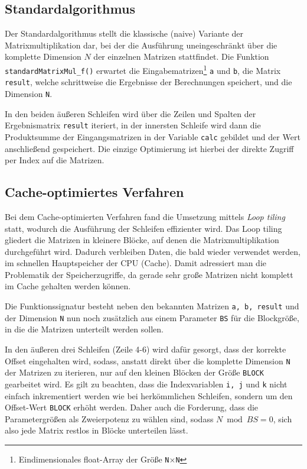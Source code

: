 \documentclass[a4paper,11pt]{scrartcl}
\begin{document}
\subsection{Standardalgorithmus}
Der Standardalgorithmus stellt die klassische (naive) Variante der Matrixmultiplikation
dar, bei der die Ausführung uneingeschränkt über die komplette Dimension $N$ der einzelnen Matrizen 
stattfindet. Die Funktion \texttt{standardMatrixMul\_f()} erwartet die Eingabematrizen\footnote{
Eindimensionales float-Array der Größe \texttt{N$\times$N}} \texttt{a} und \texttt{b},
die Matrix \texttt{result}, welche schrittweise die Ergebnisse der Berechnungen speichert, 
und die Dimension \texttt{N}.\newline




In den beiden äußeren Schleifen 
wird über die Zeilen und Spalten der Ergebnismatrix \texttt{result} iteriert,
in der innersten Schleife wird dann die Produktsumme der Eingangsmatrizen in der
Variable \texttt{calc} gebildet und der Wert anschließend gespeichert.
Die einzige Optimierung ist hierbei der direkte Zugriff per Index auf die Matrizen.


\subsection{Cache-optimiertes Verfahren}
Bei dem Cache-optimierten Verfahren fand die Umsetzung mittels \emph{Loop tiling} statt,
wodurch die Ausführung der Schleifen effizienter wird. Das Loop tiling gliedert die 
Matrizen in kleinere Blöcke, auf denen die Matrixmultiplikation durchgeführt wird.
Dadurch verbleiben Daten, die bald wieder verwendet werden, im schnellen Hauptspeicher der 
CPU (Cache). Damit adressiert man die Problematik der Speicherzugriffe, da gerade sehr große
Matrizen nicht komplett im Cache gehalten werden können.



Die Funktionssignatur besteht neben den bekannten Matrizen \texttt{a, b, result}
und der Dimension \texttt{N} nun noch zusätzlich aus einem Parameter \texttt{BS} für 
die Blockgröße, in die die Matrizen unterteilt werden sollen.\newline

In den äußeren drei Schleifen (Zeile 4-6) wird dafür gesorgt, dass der korrekte Offset eingehalten wird,
sodass, anstatt direkt über die komplette Dimension \texttt{N} der Matrizen zu iterieren, nur auf den
kleinen Blöcken der Größe \texttt{BLOCK} gearbeitet wird. Es gilt zu beachten, dass die Indexvariablen
\texttt{i,~j} und \texttt{k} nicht einfach inkrementiert werden wie bei herkömmlichen Schleifen,
sondern um den Offset-Wert \texttt{BLOCK} erhöht werden. Daher auch die Forderung, dass 
die Parametergrößen als Zweierpotenz zu wählen sind, sodass $N \bmod BS = 0$, sich also jede 
Matrix restlos in Blöcke unterteilen lässt.\newline
\end{document}
